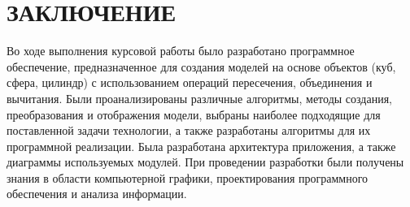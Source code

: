\section*{ЗАКЛЮЧЕНИЕ}
Во  ходе  выполнения  курсовой работы  было  разработано  программное обеспечение, предназначенное для создания моделей на основе объектов (куб, 
сфера, цилиндр) с использованием операций пересечения, объединения и 
вычитания.  
Были  проанализированы  различные  алгоритмы,  методы  создания, 
преобразования  и  отображения  модели,  выбраны  наиболее  подходящие  для поставленной  задачи  технологии,  а  также  разработаны  алгоритмы  для  их 
программной реализации. 
Была разработана архитектура приложения, а также 
диаграммы используемых модулей. 
При проведении разработки были получены знания  в  области  компьютерной  графики,  проектирования  программного обеспечения и анализа информации.
\pagebreak